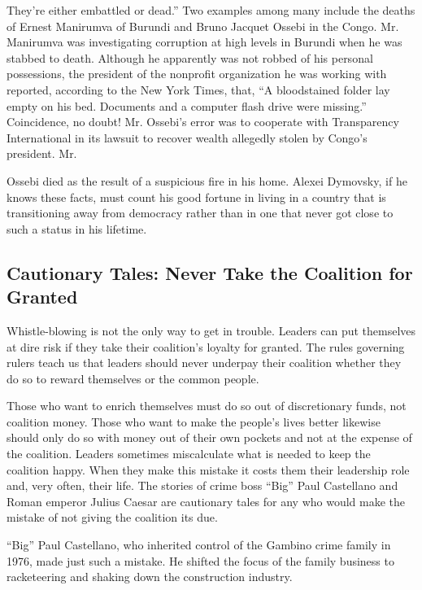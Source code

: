 \documentclass[10pt]{article}
\begin{document}
{\large They're either embattled or dead.'' Two examples among many include the
deaths of Ernest Manirumva of Burundi and Bruno Jacquet Ossebi in the Congo. Mr.
Manirumva was investigating corruption at high levels in Burundi when he was
stabbed to death. Although he apparently was not robbed of his personal
possessions, the president of the nonprofit organization he was working with
reported, according to the New York Times, that, ``A bloodstained folder lay
empty on his bed. Documents and a computer flash drive were missing.''
Coincidence, no doubt! Mr. Ossebi's error was to cooperate with Transparency
International in its lawsuit to recover wealth allegedly stolen by Congo's
president. Mr.}

{\large Ossebi died as the result of a suspicious fire in his home. Alexei
Dymovsky, if he knows these facts, must count his good fortune in living in a
country that is transitioning away from democracy rather than in one that never
got close to such a status in his lifetime.}

\subsection{Cautionary Tales: Never Take the Coalition for Granted}

{\large Whistle-blowing is not the only way to get in trouble. Leaders can put
themselves at dire risk if they take their coalition's loyalty for granted. The
rules governing rulers teach us that leaders should never underpay their
coalition whether they do so to reward themselves or the common people.}

{\large Those who want to enrich themselves must do so out of discretionary
funds, not coalition money. Those who want to make the people's lives better
likewise should only do so with money out of their own pockets and not at the
expense of the coalition. Leaders sometimes miscalculate what is needed to keep
the coalition happy. When they make this mistake it costs them their leadership
role and, very often, their life. The stories of crime boss ``Big'' Paul
Castellano and Roman emperor Julius Caesar are cautionary tales for any who would
make the mistake of not giving the coalition its due.}

{\large ``Big'' Paul Castellano, who inherited control of the Gambino crime
family in 1976, made just such a mistake. He shifted the focus of the family
business to racketeering and shaking down the construction industry.}
\end{document}
